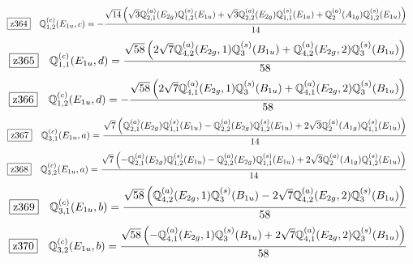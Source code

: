 \documentclass[fleqn,10pt,landscape]{jsarticle}
\begin{document}
\begin{dmath*}
\hspace*{3mm}\fbox{z364}\quad \mathbb{Q}_{1,2}^{(c)}(E_{1u},c)=- \frac{\sqrt{14} \left(\sqrt{3} \mathbb{Q}_{2,1}^{(a)}(E_{2g}) \mathbb{Q}_{1,2}^{(s)}(E_{1u}) + \sqrt{3} \mathbb{Q}_{2,2}^{(a)}(E_{2g}) \mathbb{Q}_{1,1}^{(s)}(E_{1u}) + \mathbb{Q}_{2}^{(a)}(A_{1g}) \mathbb{Q}_{1,2}^{(s)}(E_{1u})\right)}{14}
\end{dmath*}
\begin{dmath*}
\hspace*{3mm}\fbox{z365}\quad \mathbb{Q}_{1,1}^{(c)}(E_{1u},d)=\frac{\sqrt{58} \left(2 \sqrt{7} \mathbb{Q}_{4,2}^{(a)}(E_{2g},1) \mathbb{Q}_{3}^{(s)}(B_{1u}) + \mathbb{Q}_{4,2}^{(a)}(E_{2g},2) \mathbb{Q}_{3}^{(s)}(B_{1u})\right)}{58}
\end{dmath*}
\begin{dmath*}
\hspace*{3mm}\fbox{z366}\quad \mathbb{Q}_{1,2}^{(c)}(E_{1u},d)=- \frac{\sqrt{58} \left(2 \sqrt{7} \mathbb{Q}_{4,1}^{(a)}(E_{2g},1) \mathbb{Q}_{3}^{(s)}(B_{1u}) + \mathbb{Q}_{4,1}^{(a)}(E_{2g},2) \mathbb{Q}_{3}^{(s)}(B_{1u})\right)}{58}
\end{dmath*}
\begin{dmath*}
\hspace*{3mm}\fbox{z367}\quad \mathbb{Q}_{3,1}^{(c)}(E_{1u},a)=\frac{\sqrt{7} \left(\mathbb{Q}_{2,1}^{(a)}(E_{2g}) \mathbb{Q}_{1,1}^{(s)}(E_{1u}) - \mathbb{Q}_{2,2}^{(a)}(E_{2g}) \mathbb{Q}_{1,2}^{(s)}(E_{1u}) + 2 \sqrt{3} \mathbb{Q}_{2}^{(a)}(A_{1g}) \mathbb{Q}_{1,1}^{(s)}(E_{1u})\right)}{14}
\end{dmath*}
\begin{dmath*}
\hspace*{3mm}\fbox{z368}\quad \mathbb{Q}_{3,2}^{(c)}(E_{1u},a)=\frac{\sqrt{7} \left(- \mathbb{Q}_{2,1}^{(a)}(E_{2g}) \mathbb{Q}_{1,2}^{(s)}(E_{1u}) - \mathbb{Q}_{2,2}^{(a)}(E_{2g}) \mathbb{Q}_{1,1}^{(s)}(E_{1u}) + 2 \sqrt{3} \mathbb{Q}_{2}^{(a)}(A_{1g}) \mathbb{Q}_{1,2}^{(s)}(E_{1u})\right)}{14}
\end{dmath*}
\begin{dmath*}
\hspace*{3mm}\fbox{z369}\quad \mathbb{Q}_{3,1}^{(c)}(E_{1u},b)=\frac{\sqrt{58} \left(\mathbb{Q}_{4,2}^{(a)}(E_{2g},1) \mathbb{Q}_{3}^{(s)}(B_{1u}) - 2 \sqrt{7} \mathbb{Q}_{4,2}^{(a)}(E_{2g},2) \mathbb{Q}_{3}^{(s)}(B_{1u})\right)}{58}
\end{dmath*}
\begin{dmath*}
\hspace*{3mm}\fbox{z370}\quad \mathbb{Q}_{3,2}^{(c)}(E_{1u},b)=\frac{\sqrt{58} \left(- \mathbb{Q}_{4,1}^{(a)}(E_{2g},1) \mathbb{Q}_{3}^{(s)}(B_{1u}) + 2 \sqrt{7} \mathbb{Q}_{4,1}^{(a)}(E_{2g},2) \mathbb{Q}_{3}^{(s)}(B_{1u})\right)}{58}
\end{dmath*}
\end{document}
